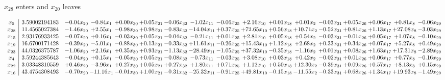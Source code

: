 \documentclass[9pt]{article}
\begin{document}
 $ x_{28} $ enters and $ x_{20} $ leaves 

 \[\begin{array}{c| c c@{\hskip 2pt} c@{\hskip 2pt} c@{\hskip 2pt} c@{\hskip 2pt} c@{\hskip 2pt} c@{\hskip 2pt} c@{\hskip 2pt} c@{\hskip 2pt} c@{\hskip 2pt} c@{\hskip 2pt} c@{\hskip 2pt} c@{\hskip 2pt} c@{\hskip 2pt} c@{\hskip 2pt} c@{\hskip 2pt} }
 x_{5}   &  3.59002194183 & -0.04 x_{20} & -0.84 x_{1} & +  0.00 x_{30} & +  0.05 x_{21} & -0.06 x_{32} & -1.02 x_{11} & -0.06 x_{25} & +  2.16 x_{10} & +  0.01 x_{18} & +  0.01 x_{2} & -0.03 x_{31} & +  0.05 x_{26} & +  0.06 x_{17} & +  0.81 x_{8} & -0.06 x_{29}\\
 x_{28}   &  11.4565027384 & -1.46 x_{20} & +  2.55 x_{1} & -0.98 x_{30} & +  0.98 x_{21} & -0.83 x_{32} & -14.04 x_{11} & +  0.37 x_{25} & + 72.65 x_{10} & +  0.56 x_{18} & + 10.71 x_{2} & -0.52 x_{31} & +  0.81 x_{26} & +  1.13 x_{17} & + 27.08 x_{8} & -3.03 x_{29}\\
 x_{15}   &  2.93176933425 & -0.07 x_{20} & +  0.16 x_{1} & -0.03 x_{30} & +  0.05 x_{21} & -0.04 x_{32} & -0.21 x_{11} & +  0.01 x_{25} & +  2.81 x_{10} & +  0.05 x_{18} & +  0.54 x_{2} & -0.03 x_{31} & -0.01 x_{26} & +  0.05 x_{17} & +  1.07 x_{8} & -0.10 x_{29}\\
 x_{19}   &  16.6700171428 & -0.39 x_{20} & -5.01 x_{1} & -0.88 x_{30} & +  0.13 x_{21} & -0.33 x_{32} & + 11.61 x_{11} & -0.26 x_{25} & + 15.43 x_{10} & +  1.12 x_{18} & +  2.68 x_{2} & +  0.33 x_{31} & +  0.34 x_{26} & +  0.07 x_{17} & +  5.27 x_{8} & +  0.49 x_{29}\\
 x_{23}   &  44.0326375787 & -1.06 x_{20} & +  2.16 x_{1} & +  0.35 x_{30} & +  0.93 x_{21} & -1.13 x_{32} & -28.49 x_{11} & -1.05 x_{25} & + 37.32 x_{10} & -0.35 x_{18} & -1.16 x_{2} & +  0.01 x_{31} & +  0.08 x_{26} & +  1.63 x_{17} & + 17.31 x_{8} & -2.89 x_{29}\\
 x_{4}   &  3.59244385643 & -0.04 x_{20} & +  0.15 x_{1} & -0.05 x_{30} & +  0.05 x_{21} & -0.08 x_{32} & -0.73 x_{11} & -0.03 x_{25} & +  3.08 x_{10} & +  0.03 x_{18} & +  0.42 x_{2} & -0.02 x_{31} & +  0.01 x_{26} & +  0.06 x_{17} & +  0.77 x_{8} & -0.16 x_{29}\\
 x_{22}   &  3.03348310559 & +  0.46 x_{20} & -3.96 x_{1} & +  0.27 x_{30} & +  0.05 x_{21} & +  0.27 x_{32} & +  1.80 x_{11} & +  0.71 x_{25} & +  1.12 x_{10} & +  0.50 x_{18} & + 12.30 x_{2} & -0.39 x_{31} & +  0.09 x_{26} & +  0.57 x_{17} & +  8.13 x_{8} & +  0.15 x_{29}\\
 x_{16}   &  43.4754308493 & -0.70 x_{20} & -11.16 x_{1} & -0.01 x_{30} & +  1.00 x_{21} & -0.31 x_{32} & -25.32 x_{11} & -0.91 x_{25} & + 49.81 x_{10} & -0.15 x_{18} & -11.55 x_{2} & -0.33 x_{31} & +  0.68 x_{26} & +  1.34 x_{17} & + 19.93 x_{8} & -1.49 x_{29}\\

\end{array}\]
\end{document}
